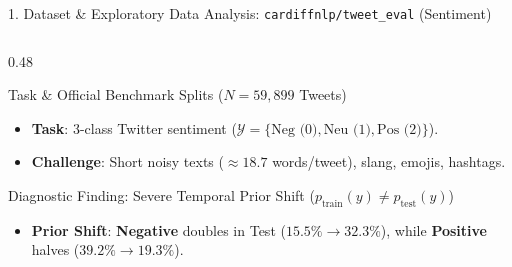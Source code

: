 \documentclass[aspectratio=169, 9pt]{beamer}
\begin{document}
\begin{frame}{1. Dataset \& Exploratory Data Analysis: \texttt{cardiffnlp/tweet\_eval} (Sentiment)}
\vspace{-2mm}
\begin{columns}[T, onlytextwidth]
  \begin{column}{0.48\textwidth}
    \begin{block}{Task \& Official Benchmark Splits ($N = 59,899$ Tweets)}
      \scriptsize
      \begin{itemize}\setlength{\itemsep}{1pt}
        \item \textbf{Task}: 3-class Twitter sentiment ($\mathcal{Y} = \{\text{Neg (0)}, \text{Neu (1)}, \text{Pos (2)}\}$).
        \item \textbf{Challenge}: Short noisy texts ($\approx 18.7$ words/tweet), slang, emojis, hashtags.
      \end{itemize}
      \vspace{0.5mm}
      \centering
      \renewcommand{\arraystretch}{1.05}
    \end{block}
    \vspace{-1.5mm}
    \begin{alertblock}{Diagnostic Finding: Severe Temporal Prior Shift ($p_{\text{train}}(y) \neq p_{\text{test}}(y)$)}
      \scriptsize
      \begin{itemize}\setlength{\itemsep}{1pt}
        \item \textbf{Prior Shift}: \textbf{Negative} doubles in Test ($15.5\% \to 32.3\%$), while \textbf{Positive} halves ($39.2\% \to 19.3\%$).

\end{itemize}
\end{alertblock}
\end{column}
\end{columns}
\end{frame}
\end{document}
